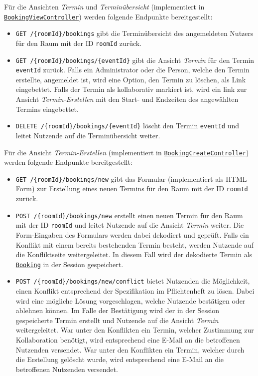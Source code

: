 Für die Ansichten \textit{Termin} und \textit{Terminübersicht} (implementiert in \hyperref[edu.kit.hci.soli.controller.BookingViewController]{\texttt{BookingViewController}}) werden folgende Endpunkte bereitgestellt:
\begin{itemize}
    \item \texttt{GET /\{roomId\}/bookings} gibt die Terminübersicht des angemeldeten Nutzers für den Raum mit der ID \texttt{roomId} zurück.
    \item \texttt{GET /\{roomId\}/bookings/\{eventId\}} gibt die Ansicht \textit{Termin} für den Termin \texttt{eventId} zurück.
          Falls ein Administrator oder die Person, welche den Termin erstellte, angemeldet ist, wird eine Option, den Termin zu löschen, als Link eingebettet.
          Falls der Termin als kollaborativ markiert ist, wird ein link zur Ansicht \textit{Termin-Erstellen} mit den Start- und Endzeiten des angewählten Termins eingebettet.
    \item \texttt{DELETE /\{roomId\}/bookings/\{eventId\}} löscht den Termin \texttt{eventId} und leitet Nutzende auf die Terminübersicht weiter.
\end{itemize}

Für die Ansicht \textit{Termin-Erstellen} (implementiert in \hyperref[edu.kit.hci.soli.controller.BookingCreateController]{\texttt{BookingCreateController}}) werden folgende Endpunkte bereitgestellt:
\begin{itemize}
    \item \texttt{GET /\{roomId\}/bookings/new} gibt das Formular (implementiert als \gls{HTML-Form}) zur Erstellung eines neuen Termins für den Raum mit der ID \texttt{roomId} zurück.
    \item \texttt{POST /\{roomId\}/bookings/new} erstellt einen neuen Termin für den Raum mit der ID \texttt{roomId} und leitet Nutzende auf die Ansicht \textit{Termin} weiter.
          Die Form-Eingaben des Formulars werden dabei dekodiert und geprüft.
          Falls ein Konflikt mit einem bereits bestehenden Termin besteht, werden Nutzende auf die Konfliktseite weitergeleitet.
          In diesem Fall wird der dekodierte Termin als \hyperref[edu.kit.hci.soli.domain.Booking]{\texttt{Booking}} in der Session gespeichert.
    \item \texttt{POST /\{roomId\}/bookings/new/conflict} bietet Nutzenden die Möglichkeit, einen Konflikt entsprechend der Spezifikation im Pflichtenheft zu lösen.
          Dabei wird eine mögliche Lösung vorgeschlagen, welche Nutzende bestätigen oder ablehnen können.
          Im Falle der Bestätigung wird der in der Session gespeicherte Termin erstellt und Nutzende auf die Ansicht \textit{Termin} weitergeleitet.
          War unter den Konflikten ein Termin, welcher Zustimmung zur Kollaboration benötigt, wird entsprechend eine E-Mail an die betroffenen Nutzenden versendet.
          War unter den Konflikten ein Termin, welcher durch die Erstellung gelöscht wurde, wird entsprechend eine E-Mail an die betroffenen Nutzenden versendet.
\end{itemize}

